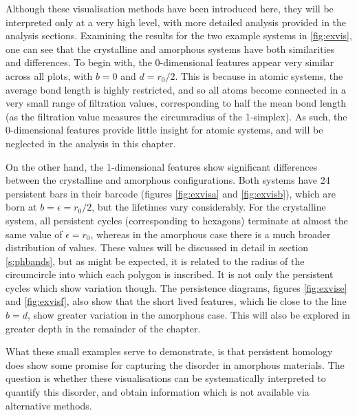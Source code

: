 Although these visualisation methods have been introduced here, they will be interpreted only at a very high level, with more detailed analysis provided in the analysis sections.
Examining the results for the two example systems in \ref{fig:exvis}, one can see that the crystalline and amorphous systems have both similarities and differences.
To begin with, the 0\--dimensional features appear very similar across all plots, with $b=0$ and $d=r_0/2$.
This is because in atomic systems, the average bond length is highly restricted, and so all atoms become connected in a very small range of filtration values, corresponding to half the mean bond length (as the filtration value measures the circumradius of the 1\--simplex).
As such, the $0$\--dimensional features provide little insight for atomic systems, and will be neglected in the analysis in this chapter.

On the other hand, the 1\--dimensional features show significant differences between the crystalline and amorphous configurations.
Both systems have 24 persistent bars in their barcode (figures \ref{fig:exvisa} and \ref{fig:exvisb}), which are born at $b=\epsilon=r_0/2$, but the lifetimes vary considerably. 
For the crystalline system, all persistent cycles (corresponding to hexagons) terminate at almost the same value of $\epsilon=r_0$, whereas in the amorphous case there is a much broader distribution of values.
These values will be discussed in detail in section \ref{s:phbands}, but as might be expected, it is related to the radius of the circumcircle into which each polygon is inscribed. 
It is not only the persistent cycles which show variation though.
The persistence diagrams, figures \ref{fig:exvise} and \ref{fig:exvisf}, also show that the short lived features, which lie close to the line $b=d$, show greater variation in the amorphous case.
This will also be explored in greater depth in the remainder of the chapter.

What these small examples serve to demonstrate, is that persistent homology does show some promise for capturing the disorder in amorphous materials.
The question is whether these visualisations can be systematically interpreted to quantify this disorder, and obtain information which is not available via alternative methods.

